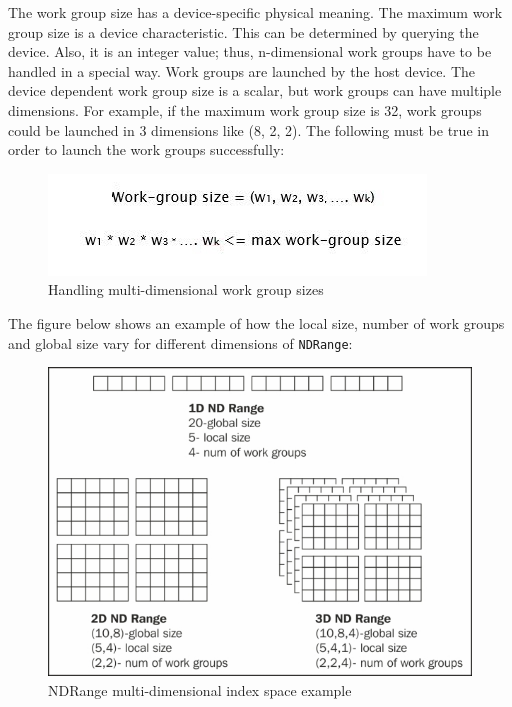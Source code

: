 The work group size has a device-specific physical meaning. The maximum work group size is a device characteristic. This can be determined by querying the device. Also, it is an integer value; thus, n-dimensional work groups have to be handled in a special way. Work groups are launched by the host device. \newline\newline
The device dependent work group size is a scalar, but work groups can have multiple dimensions. For example, if the maximum work group size is 32, work groups could be launched in 3 dimensions like (8, 2, 2). The following must be true in order to launch the work groups successfully: 
\begin{figure}[h!]
\centering
\includegraphics[width=\linewidth]{figures/Work-Group_Size.JPG}
\caption{Handling multi-dimensional work group sizes}
\label{fig:opencl4}
\end{figure} 

The figure below shows an example of how the local size, number of work groups and global size vary for different dimensions of \verb|NDRange|:
\begin{figure}[h!]
\centering
\includegraphics[width=\linewidth]{figures/NDRange_Kernel_Example.jpg}
\caption{NDRange multi-dimensional index space example}
\label{fig:opencl5}
\end{figure}

